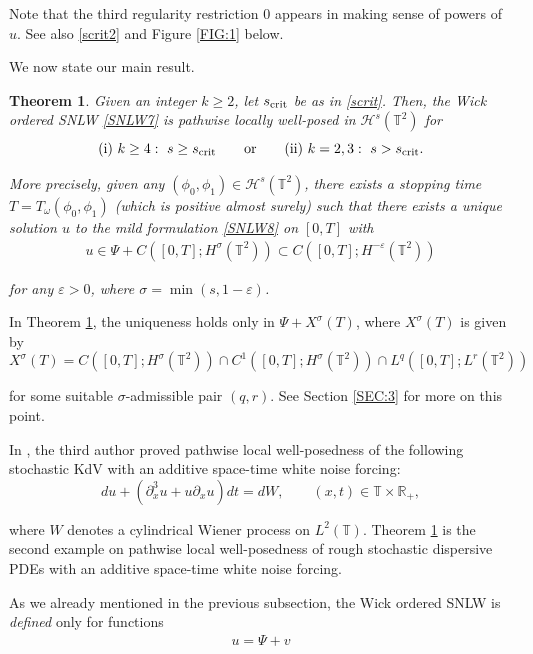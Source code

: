 \documentclass[letterpaper, 11pt,  reqno]{amsart}
\newtheorem{theorem}{Theorem} [section]
\newcommand{\1}{\hspace{0.5mm}\text{I}\hspace{0.5mm}}
\newcommand{\noi}{\noindent}
\newcommand{\R}{\mathbb{R}}
\newcommand{\T}{\mathbb{T}}
\newcommand{\eps}{\varepsilon}
\newcommand{\s}{\sigma}
\newcommand{\dx}{\partial_x}
\renewcommand{\o}{\omega}
\renewcommand{\H}{\mathcal{H}}
\numberwithin{equation}{section}
\numberwithin{theorem}{section}
\begin{document}
\noi
Note that the third regularity restriction
$0$
appears in making sense of powers of $u$.
See also \eqref{scrit2} and Figure \ref{FIG:1} below.

We now state our main result.

\begin{theorem}\label{THM:1}
Given  an integer  $k \geq 2$, let $s_\textup{crit}$ be as in \eqref{scrit}.
Then, the Wick ordered SNLW \eqref{SNLW7}
is pathwise locally well-posed in $\H^s(\T^2)$
for 
\[ \textup{(i) } k \geq 4: 
\ s \geq  s_\textup{crit}
\qquad \text{or} \qquad 
 \textup{(ii) }  k = 2, 3: 
\ s >  s_\textup{crit}.
\]



\noi
More precisely, 
given any $(\phi_0, \phi_1) \in \H^s(\T^2)$, 
there exists a stopping time $T =  T_\o( \phi_0, \phi_1)$
(which is positive almost surely)
such that there exists  a unique solution $u $ to the mild formulation \eqref{SNLW8} on $[0, T]$
with 
\begin{align*}
u \in    \Psi + C([0, T]; H^\s(\T^2)) 
\subset C([0, T]; H^{-\eps}(\T^2)) 
\end{align*}
	
\noi
for any $\eps > 0$, where $\s = \min(s, 1-\eps)$.

\end{theorem} 

In Theorem \ref{THM:1}, 
the uniqueness holds only in 
 $\Psi + X^\s(T)$, 
  where $X^\s(T)$ is given by 
\[ X^\s(T) = C([0,T];H^\s(\T^2))\cap C^1([0,T]; H^\s(\T^2))\cap L^q([0, T]; L^r(\T^2))
\]

\noi
for some suitable $\s$-admissible pair $(q, r)$.
See Section \ref{SEC:3} for more on this point.


In \cite{Oh}, the third author proved pathwise local well-posedness of  
the following stochastic KdV
 with an additive space-time white noise
forcing:
\[ d u + (\dx^3 u  + u \dx u)dt =dW, \qquad (x, t) \in \T \times \R_+, \]

\noi
where $W$ denotes
a cylindrical Wiener process on $L^2(\T)$.
Theorem \ref{THM:1} is the second example on pathwise local well-posedness 
of rough stochastic dispersive PDEs
 with an additive space-time white noise forcing.
 
 
 
As we already mentioned in the previous subsection, 
the Wick ordered SNLW is \emph{defined} only for functions 
\begin{align}
u = \Psi+v
\label{decomp}
\end{align}
\end{document}
